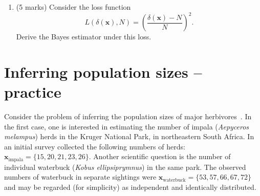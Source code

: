 \documentclass[a4paper,10pt, notitlepage]{report}
\begin{document}
\begin{enumerate}[label=\alph*)]
  

 \item (5 marks) Consider the loss function
 \begin{equation}
 \label{eq:relative_loss}
  L(\delta(\boldsymbol{x}), N) = \left(\frac{\delta(\boldsymbol{x})-N}{N} \right)^2.
 \end{equation}
 Derive the Bayes estimator under this loss.

 

\end{enumerate}

\section*{Inferring population sizes -- practice}
Consider the problem of inferring the population sizes of major herbivores~\citep{Carroll1985}.
In the first case, one is interested in estimating the number of impala (\textit{Aepyceros melampus}) herds in the Kruger National Park, in northeastern South Africa.
In an initial survey collected the following numbers of herds: $\boldsymbol{x}_{\text{impala}} = \{15, 20, 21, 23, 26\}$.
Another scientific question is the number of individual waterbuck (\textit{Kobus ellipsiprymnus}) in the same park.
The observed numbers of waterbuck in separate sightings were $\boldsymbol{x}_{\text{waterbuck}} = \{53, 57, 66, 67, 72\}$ and may be regarded (for simplicity) as independent and identically distributed.
\end{document}
